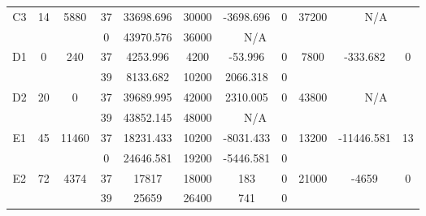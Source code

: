 \begin{sidewaystable}
\begin{tabular}{c||c|c||c|c|c|c|c||c|c|c}
         &
        
      \\
      \hline
      \multirow{2}{*}{C3} &
      \multirow{2}{*}{14} &
      \multirow{2}{*}{5880} &
      37 &
      33698.696 &
      30000 &
        -3698.696 &
        0 &
      \multirow{2}{*}{37200} &
        \multicolumn{2}{c}{\multirow{2}{*}{N/A}}
      \\
      \cline{4-8}
       &
       &
       &
      0 &
      43970.576 &
      36000 &
        \multicolumn{2}{|c||}{N/A} &
      
        
      \\
      \hline
      \multirow{2}{*}{D1} &
      \multirow{2}{*}{0} &
      \multirow{2}{*}{240} &
      37 &
      4253.996 &
      4200 &
        -53.996 &
        0 &
      \multirow{2}{*}{7800} &
        \multirow{2}{*}{-333.682} &
        \multirow{2}{*}{0}
      \\
      \cline{4-8}
       &
       &
       &
      39 &
      8133.682 &
      10200 &
        2066.318 &
        0 &
      
         &
        
      \\
      \hline
      \multirow{2}{*}{D2} &
      \multirow{2}{*}{20} &
      \multirow{2}{*}{0} &
      37 &
      39689.995 &
      42000 &
        2310.005 &
        0 &
      \multirow{2}{*}{43800} &
        \multicolumn{2}{c}{\multirow{2}{*}{N/A}}
      \\
      \cline{4-8}
       &
       &
       &
      39 &
      43852.145 &
      48000 &
        \multicolumn{2}{|c||}{N/A} &
      
        
      \\
      \hline
      \multirow{2}{*}{E1} &
      \multirow{2}{*}{45} &
      \multirow{2}{*}{11460} &
      37 &
      18231.433 &
      10200 &
        -8031.433 &
        0 &
      \multirow{2}{*}{13200} &
        \multirow{2}{*}{-11446.581} &
        \multirow{2}{*}{13}
      \\
      \cline{4-8}
       &
       &
       &
      0 &
      24646.581 &
      19200 &
        -5446.581 &
        0 &
      
         &
        
      \\
      \hline
      \multirow{2}{*}{E2} &
      \multirow{2}{*}{72} &
      \multirow{2}{*}{4374} &
      37 &
      17817 &
      18000 &
        183 &
        0 &
      \multirow{2}{*}{21000} &
        \multirow{2}{*}{-4659} &
        \multirow{2}{*}{0}
      \\
      \cline{4-8}
       &
       &
       &
      39 &
      25659 &
      26400 &
        741 &
        0 &
      

\end{tabular}
\end{sidewaystable}
